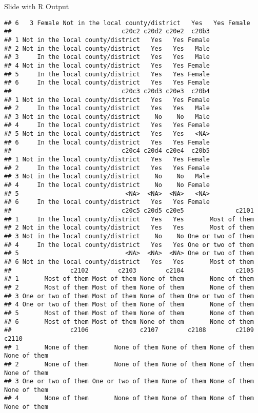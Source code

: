 \documentclass[
  ignorenonframetext,
]{beamer}
\begin{document}
\begin{frame}[fragile]{Slide with R Output}
\begin{verbatim}
## 6   3 Female Not in the local county/district   Yes   Yes Female
##                              c20c2 c20d2 c20e2  c20b3
## 1 Not in the local county/district   Yes   Yes Female
## 2 Not in the local county/district   Yes   Yes   Male
## 3     In the local county/district   Yes   Yes   Male
## 4 Not in the local county/district   Yes   Yes Female
## 5     In the local county/district   Yes   Yes Female
## 6     In the local county/district   Yes   Yes Female
##                              c20c3 c20d3 c20e3  c20b4
## 1 Not in the local county/district   Yes   Yes Female
## 2     In the local county/district   Yes   Yes   Male
## 3 Not in the local county/district    No    No   Male
## 4     In the local county/district   Yes   Yes Female
## 5 Not in the local county/district   Yes   Yes   <NA>
## 6     In the local county/district   Yes   Yes Female
##                              c20c4 c20d4 c20e4  c20b5
## 1 Not in the local county/district   Yes   Yes Female
## 2     In the local county/district   Yes   Yes Female
## 3 Not in the local county/district    No    No   Male
## 4     In the local county/district    No    No Female
## 5                             <NA>  <NA>  <NA>   <NA>
## 6     In the local county/district   Yes   Yes Female
##                              c20c5 c20d5 c20e5              c2101
## 1     In the local county/district   Yes   Yes       Most of them
## 2 Not in the local county/district   Yes   Yes       Most of them
## 3 Not in the local county/district    No    No One or two of them
## 4     In the local county/district   Yes   Yes One or two of them
## 5                             <NA>  <NA>  <NA> One or two of them
## 6 Not in the local county/district   Yes   Yes       Most of them
##                c2102        c2103        c2104              c2105
## 1       Most of them Most of them None of them       None of them
## 2       Most of them Most of them None of them       None of them
## 3 One or two of them Most of them None of them One or two of them
## 4 One or two of them Most of them None of them       None of them
## 5       Most of them Most of them None of them       None of them
## 6       Most of them Most of them None of them       None of them
##                c2106              c2107        c2108        c2109        c2110
## 1       None of them       None of them None of them None of them None of them
## 2       None of them       None of them None of them None of them None of them
## 3 One or two of them One or two of them None of them None of them None of them
## 4       None of them       None of them None of them None of them None of them

\end{verbatim}
\end{frame}
\end{document}
